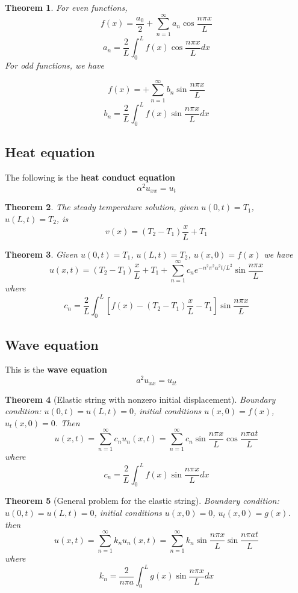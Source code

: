 \documentclass[letter]{article}
\newtheorem{theorem}{Theorem}[section]
\newenvironment{definition}[1][Definition]{\begin{trivlist}
\item[\hskip \labelsep {\bfseries #1}]}{\end{trivlist}}
\begin{document}
\begin{theorem}
For even functions,
\[f(x) = \frac{a_0}{2} + \sum_{n=1}^\infty a_n \cos \frac{n\pi x}{L}\]
\[a_n = \frac{2}{L} \int_{0}^L f(x) \cos \frac{n\pi x}{L} dx \]
For odd functions, we have

\[f(x) =+ \sum_{n=1}^\infty b_n \sin \frac{n\pi x}{L}\]
\[b_n = \frac{2}{L} \int_{0}^L  f(x) \sin \frac{n\pi x}{L} dx \]
\end{theorem}

\subsection{Heat equation}
\begin{definition}
The following is the \textbf{heat conduct equation}
\[
\alpha^2 u_{xx} = u_{t}
\]
\end{definition}

\begin{theorem}
The steady temperature solution, given  $u(0,t) = T_1$, $u(L,t) = T_2$, is
\[
v(x) = (T_2 - T_1)\frac{x}{L} + T_1
\]
\end{theorem}
\begin{theorem}
Given  $u(0,t) = T_1$, $u(L,t) = T_2$, $u(x,0) = f(x)$
we have
\[
u(x,t) = (T_2-T_1)\frac{x}{L} + T_1 + \sum_{n=1}^\infty c_n e^{-n^2\pi^2\alpha^2 t/L^2} \sin \frac{n\pi x}{L}
\]
where
\[
c_n = \frac{2}{L} \int_0^L [f(x) - (T_2-T_1)\frac{x}{L} - T_1] \sin \frac{n\pi x}{L}
\]
\end{theorem}

\subsection{Wave equation}
\begin{definition}
This is the \textbf{wave equation}
\[
a^2 u_{xx} = u_{tt}
\]
\end{definition}

\begin{theorem}[Elastic string with nonzero initial displacement]
Boundary condition: $u(0,t) = u(L,t) = 0$, initial conditions $u(x,0) = f(x)$, $u_t(x,0) = 0$.
Then
\[
u(x,t) = \sum_{n=1}^\infty c_n u_n (x,t) = \sum_{n=1}^\infty c_n \sin \frac{n\pi x}{L} \cos \frac{n\pi at}{L}
\]
where
\[
c_n = \frac{2}{L}\int_0^L f(x) \sin \frac{n\pi x}{L} dx
\]
\end{theorem}

\begin{theorem}[General problem for the elastic string]
Boundary condition: $u(0,t) = u(L,t) = 0$, initial conditions $u(x,0) = 0$, $u_t(x,0) = g(x)$.
then
\[
u(x,t) = \sum_{n=1}^\infty k_n u_n (x,t) = \sum_{n=1}^\infty k_n \sin \frac{n\pi x}{L} \sin \frac{n\pi at}{L}
\]
where
\[
k_n = \frac{2}{n\pi a}\int_0^L g(x) \sin \frac{n\pi x}{L} dx
\]
\end{theorem}
\end{document}

